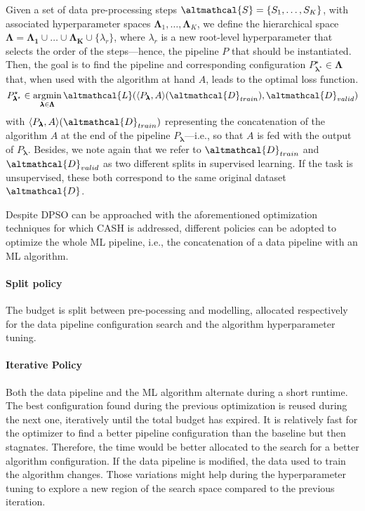 \begin{definition}
    Given a set of data pre-processing steps $\altmathcal{S} = \{S_1, \dots, S_K\}$, with associated hyperparameter spaces  $\pmb{\Lambda}_1, \dots, \pmb{\Lambda}_K$, we define the hierarchical space $\pmb{\Lambda} = \pmb{\Lambda_1} \cup \dots \cup \pmb{\Lambda_K} \cup \{\lambda_r\}$, where $\lambda_r$ is a new root-level hyperparameter that selects the order of the steps---hence, the pipeline $P$ that should be instantiated. Then, the goal is to find the pipeline and corresponding configuration $P^{\star}_{\pmb{\lambda}^{\star}} \in \pmb{\Lambda}$ that, when used with the algorithm at hand $A$, leads to the optimal loss function.
    \begin{equation*}
        P^{\star}_{\pmb{\lambda}^{\star}} \in \argmin_{\pmb{\lambda} \in \pmb{\Lambda}} \altmathcal{L}(\langle P_{\pmb{\lambda}}, A \rangle (\altmathcal{D}_{train}), \altmathcal{D}_{valid})
    \end{equation*}
    with $\langle P_{\pmb{\lambda}}, A \rangle (\altmathcal{D}_{train})$ representing the concatenation of the algorithm $A$ at the end of the pipeline $P_{\pmb{\lambda}}$---i.e., so that $A$ is fed with the output of $P_{\pmb{\lambda}}$.
    Besides, we note again that we refer to $\altmathcal{D}_{train}$ and $\altmathcal{D}_{valid}$ as two different splits in supervised learning. If the task is unsupervised, these both correspond to the same original dataset $\altmathcal{D}$.
\end{definition}

Despite DPSO can be approached with the aforementioned optimization techniques for which CASH is addressed, different policies can be adopted to optimize the whole ML pipeline, i.e., the concatenation of a data pipeline with an ML algorithm.

\paragraph{Split policy}
The budget is split between pre-pocessing and modelling, allocated respectively for the data pipeline configuration search and the algorithm hyperparameter tuning.

\paragraph{Iterative Policy}
Both the data pipeline and the ML algorithm alternate during a short runtime.
The best configuration found during the previous optimization is reused during the next one, iteratively until the total budget has expired.
It is relatively fast for the optimizer to find a better pipeline configuration than the baseline but then stagnates.
Therefore, the time would be better allocated to the search for a better algorithm configuration.
If the data pipeline is modified, the data used to train the algorithm changes.
Those variations might help during the hyperparameter tuning to explore a new region of the search space compared to the previous iteration.

